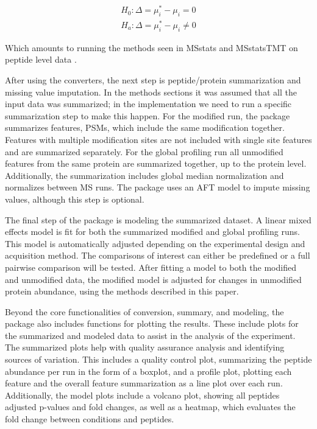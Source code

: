 \documentclass[mcp]{article}
\numberwithin{table}{section}
\begin{document}
\begin{equation}
\begin{aligned}
H_{0}: \Delta = \mu_{i}^{\ast} - \mu_{i} = 0 \\
H_{a}: \Delta = \mu_{i}^{\ast} - \mu_{i} \neq 0
\end{aligned}
\label{eq_9}
\end{equation}

Which amounts to running the methods seen in MSstats and MSstatsTMT on peptide level data \cite{Choi:2014} \cite{Huang:2020}.

After using the converters, the next step is peptide/protein summarization and missing value imputation. In the methods sections it was assumed that all the input data was summarized; in the implementation we need to run a specific summarization step to make this happen. For the modified run, the package summarizes features, PSMs, which include the same modification together. Features with multiple modification sites are not included with single site features and are summarized separately. For the global profiling run all unmodified features from the same protein are summarized together, up to the protein level. Additionally, the summarization includes global median normalization and normalizes between MS runs. The package uses an AFT model to impute missing values, although this step is optional.

The final step of the package is modeling the summarized dataset. A linear mixed effects model is fit for both the summarized modified and global profiling runs. This model is automatically adjusted depending on the experimental design and acquisition method. The comparisons of interest can either be predefined or a full pairwise comparison will be tested. After fitting a model to both the modified and unmodified data, the modified model is adjusted for changes in unmodified protein abundance, using the methods described in this paper. 

Beyond the core functionalities of conversion, summary, and modeling, the package also includes functions for plotting the results. These include plots for the summarized and modeled data to assist in the analysis of the experiment. The summarized plots help with quality assurance analysis and identifying sources of variation. This includes a quality control plot, summarizing the peptide abundance per run in the form of a boxplot, and a profile plot, plotting each feature and the overall feature summarization as a line plot over each run. Additionally, the model plots include a volcano plot, showing all peptides adjusted p-values and fold changes, as well as a heatmap, which evaluates the fold change between conditions and peptides. 
\end{document}
